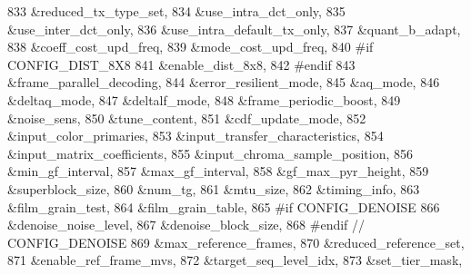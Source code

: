 \begin{DoxyCodeInclude}
{{{{{{{833                                        &reduced\_tx\_type\_set,
834                                        &use\_intra\_dct\_only,
835                                        &use\_inter\_dct\_only,
836                                        &use\_intra\_default\_tx\_only,
837                                        &quant\_b\_adapt,
838                                        &coeff\_cost\_upd\_freq,
839                                        &mode\_cost\_upd\_freq,
840 \textcolor{preprocessor}{#if CONFIG\_DIST\_8X8}
841                                        &enable\_dist\_8x8,
842 \textcolor{preprocessor}{#endif}
843                                        &frame\_parallel\_decoding,
844                                        &error\_resilient\_mode,
845                                        &aq\_mode,
846                                        &deltaq\_mode,
847                                        &deltalf\_mode,
848                                        &frame\_periodic\_boost,
849                                        &noise\_sens,
850                                        &tune\_content,
851                                        &cdf\_update\_mode,
852                                        &input\_color\_primaries,
853                                        &input\_transfer\_characteristics,
854                                        &input\_matrix\_coefficients,
855                                        &input\_chroma\_sample\_position,
856                                        &min\_gf\_interval,
857                                        &max\_gf\_interval,
858                                        &gf\_max\_pyr\_height,
859                                        &superblock\_size,
860                                        &num\_tg,
861                                        &mtu\_size,
862                                        &timing\_info,
863                                        &film\_grain\_test,
864                                        &film\_grain\_table,
865 \textcolor{preprocessor}{#if CONFIG\_DENOISE}
866                                        &denoise\_noise\_level,
867                                        &denoise\_block\_size,
868 \textcolor{preprocessor}{#endif  // CONFIG\_DENOISE}
869                                        &max\_reference\_frames,
870                                        &reduced\_reference\_set,
871                                        &enable\_ref\_frame\_mvs,
872                                        &target\_seq\_level\_idx,
873                                        &set\_tier\_mask,
}}}}}}}
\end{DoxyCodeInclude}
